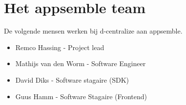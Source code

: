 \section{Het appsemble team}

De volgende mensen werken bij d-centralize aan appsemble.

\begin{itemize}
	\item Remco Hassing			- Project lead
	\item Mathijs van den Worm	- Software Engineer
	\item David Diks			- Software stagaire (SDK)
	\item Guus Hamm				- Software Stagaire (Frontend)
\end{itemize}